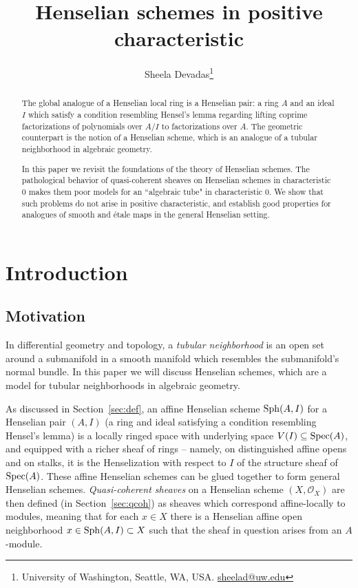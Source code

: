 \documentclass[12pt]{article}
\author{Sheela Devadas\thanks{University of Washington, Seattle, WA, USA. \href{mailto:sheelad@uw.edu}{sheelad@uw.edu}}}
\title{Henselian schemes in positive characteristic}
\date{}
\renewcommand{\O}{\mathscr{O}}
\newcommand{\spec}{{\rm Spec}}
\newcommand{\sph}{{\rm Sph}}
\newcommand{\Et}{\'etale\xspace}
\theoremstyle{definition}
\numberwithin{equation}{subsection}
\begin{document}
\maketitle
\begin{abstract} The global analogue of a Henselian local ring is a Henselian pair: a ring $A$ and an ideal $I$ which satisfy a condition resembling Hensel's lemma regarding lifting coprime factorizations of polynomials over $A/I$ to factorizations over $A$. The geometric counterpart is the notion of a Henselian scheme, which is an analogue of a tubular neighborhood in algebraic geometry. 

In this paper we revisit the foundations of the theory of Henselian schemes. The pathological behavior of quasi-coherent sheaves on Henselian schemes in characteristic 0 makes them poor models for an “algebraic tube" in characteristic 0. We show that such problems do not arise in positive characteristic, and establish good properties for analogues of smooth and \Et maps in the general Henselian setting.\end{abstract}
\tableofcontents



\section{Introduction}\label{sec:intro}

\subsection{Motivation}\label{sub:motiv}

In differential geometry and topology, a {\it tubular neighborhood} is an open set around a submanifold in a smooth manifold which resembles the submanifold's normal bundle. In this paper we will discuss Henselian schemes, which are a model for tubular neighborhoods in algebraic geometry.

As discussed in Section~\ref{sec:def}, an affine Henselian scheme $\sph(A,I)$ for a Henselian pair $(A,I)$ (a ring and ideal satisfying a condition resembling Hensel's lemma) is a locally ringed space with underlying space $V(I) \subseteq \spec(A)$, and equipped with a richer sheaf of rings -- namely, on distinguished affine opens and on stalks, it is the Henselization with respect to $I$ of the structure sheaf of $\spec(A)$. These affine Henselian schemes can be glued together to form general Henselian schemes. {\it Quasi-coherent sheaves} on a Henselian scheme $(X,\O_X)$ are then defined (in Section~\ref{sec:qcoh}) as sheaves which correspond affine-locally to modules, meaning that for each $x \in X$ there is a Henselian affine open neighborhood $x \in \sph(A,I) \subset X$ such that the sheaf in question arises from an $A$-module.
\end{document}
